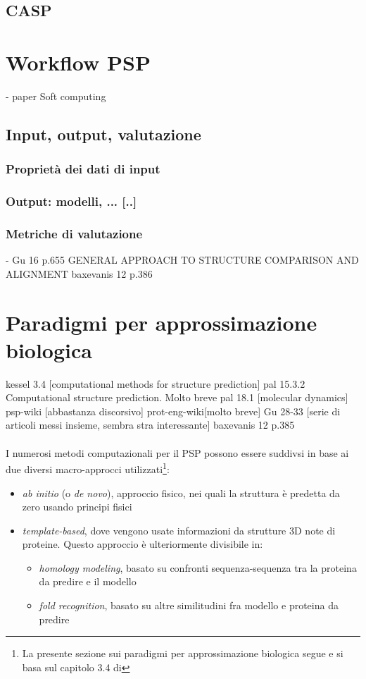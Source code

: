 \subsection{CASP}

\section{Workflow PSP}
- paper Soft computing
\subsection{Input, output, valutazione}
\subsubsection{Proprietà dei dati di input}

\subsubsection{Output: modelli, ... [..]}
\subsubsection{Metriche di valutazione}
- Gu 16 p.655 GENERAL APPROACH TO STRUCTURE COMPARISON AND ALIGNMENT
baxevanis 12 p.386

\section{Paradigmi per approssimazione biologica}
kessel 3.4 [computational methods for structure prediction]
pal 15.3.2 Computational structure prediction. Molto breve
pal 18.1 [molecular dynamics]
psp-wiki [abbastanza discorsivo]
prot-eng-wiki[molto breve]
Gu 28-33 [serie di articoli messi insieme, sembra stra interessante]
baxevanis 12 p.385 \\ \\


I numerosi metodi computazionali per il PSP possono essere suddivsi in base ai due diversi macro-approcci utilizzati\footnote{La presente sezione sui paradigmi per approssimazione biologica segue e si basa sul capitolo 3.4 di }:
\begin{itemize}
	\item \textit{ab initio} (o \textit{de novo}), approccio fisico, nei quali la struttura è predetta da zero usando principi fisici
	\item \textit{template-based}, dove vengono usate informazioni da strutture 3D note di proteine. Questo approccio è ulteriormente divisibile in:
	\begin{itemize}
		\item \textit{homology modeling}, basato su confronti sequenza-sequenza tra la proteina da predire e il modello
	\item \textit{fold recognition}, basato su altre similitudini fra modello e proteina da predire
	\end{itemize}
\end{itemize}

